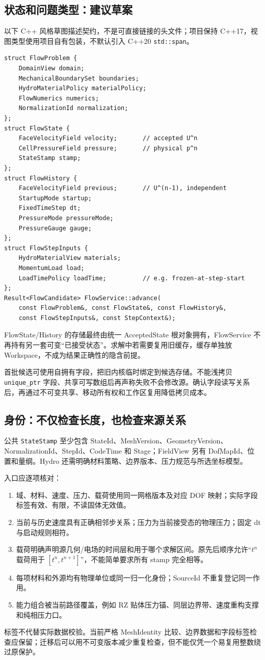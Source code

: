 \documentclass[UTF8,a4paper,11pt,fontset=fandol]{ctexart}
\newcommand{\code}[1]{\nolinkurl{#1}}
\begin{document}
\subsection{状态和问题类型：建议草案}
以下 C++ 风格草图描述契约，不是可直接链接的头文件；项目保持 C++17，视图类型使用项目自有包装，不默认引入 C++20 \code{std::span}。
\begin{lstlisting}
struct FlowProblem {
    DomainView domain;
    MechanicalBoundarySet boundaries;
    HydroMaterialPolicy materialPolicy;
    FlowNumerics numerics;
    NormalizationId normalization;
};
struct FlowState {
    FaceVelocityField velocity;       // accepted U^n
    CellPressureField pressure;       // physical p^n
    StateStamp stamp;
};
struct FlowHistory {
    FaceVelocityField previous;       // U^(n-1), independent
    StartupMode startup;
    FixedTimeStep dt;
    PressureMode pressureMode;
    PressureGauge gauge;
};
struct FlowStepInputs {
    HydroMaterialView materials;
    MomentumLoad load;
    LoadTimePolicy loadTime;          // e.g. frozen-at-step-start
};
Result<FlowCandidate> FlowService::advance(
    const FlowProblem&, const FlowState&, const FlowHistory&,
    const FlowStepInputs&, const StepContext&);
\end{lstlisting}
FlowState/History 的存储最终由统一 AcceptedState 根对象拥有，FlowService 不再持有另一套可变“已接受状态”。求解中若需要复用旧缓存，缓存单独放 Workspace，不成为结果正确性的隐含前提。

首批候选可使用自拥有字段，把旧内核临时绑定到候选存储。不能浅拷贝 \code{unique_ptr} 字段、共享可写数组后再声称失败不会修改源。确认字段读写关系后，再通过不可变共享、移动所有权和工作区复用降低拷贝成本。

\subsection{身份：不仅检查长度，也检查来源关系}
公共 \code{StateStamp} 至少包含 StateId、MeshVersion、GeometryVersion、NormalizationId、StepId、CodeTime 和 Stage；FieldView 另有 DofMapId、位置和量纲。Hydro 还需明确材料策略、边界版本、压力规范与所选坐标模型。

入口应逐项核对：
\begin{enumerate}
 \item 域、材料、速度、压力、载荷使用同一网格版本及对应 DOF 映射；实际字段标签有效、有限，不读固体无效值。
 \item 当前与历史速度具有正确相邻步关系；压力为当前接受态的物理压力；固定 dt 与启动规则相符。
 \item 载荷明确声明源几何/电场的时间层和用于哪个求解区间。原先后顺序允许“$t^n$ 载荷用于 $[t^n,t^{n+1}]$”，不能简单要求所有 stamp 完全相等。
 \item 每项材料和外源均有物理单位或同一归一化身份；SourceId 不重复登记同一作用。
 \item 能力组合被当前路径覆盖，例如 RZ 贴体压力锚、同层边界带、速度重构支撑和纯相压力口。
\end{enumerate}
标签不代替实际数据校验。当前严格 MeshIdentity 比较、边界数据和字段标签检查应保留；迁移后可以用不可变版本减少重复检查，但不能仅凭一个易复用整数绕过原保护。
\end{document}
